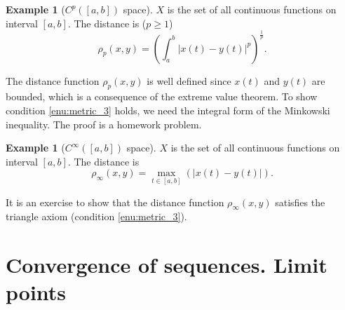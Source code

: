 \documentclass[a4paper,12pt]{article}
\theoremstyle{definition}
\newtheorem{expl}[thm]{Example}
\theoremstyle{remark}
\begin{document}
\begin{expl}[{$C^p([a, b])$ space}]
  $X$ is the set of all continuous functions on interval $[a, b]$. The distance is ($p \geq 1$)
  \begin{equation*}
    \rho_p(x, y) = \left( \int^b_a \lvert x(t) - y(t) \rvert^p \right)^{\frac{1}{p}}.
  \end{equation*}
\end{expl}

The distance function $\rho_p(x, y)$ is well defined since $x(t)$ and $y(t)$ are bounded, which is a consequence of the extreme value theorem. To show condition \ref{enu:metric_3} holds, we need the integral form of the Minkowski inequality. The proof is a homework problem.

\begin{expl}[{$C^{\infty}  ([a, b ]) $ space}]
  $X$ is the set of all continuous functions on interval $[a, b]$. The distance is
  \begin{equation*}
    \rho_{\infty}(x, y) = \max_{t \in [a, b]} (\lvert x(t) - y(t) \rvert).
  \end{equation*}
\end{expl}

It is an exercise to show that the distance function $\rho_{\infty}(x, y)$ satisfies the triangle axiom (condition \ref{enu:metric_3}).

\section{Convergence of sequences. Limit points}
\end{document}
